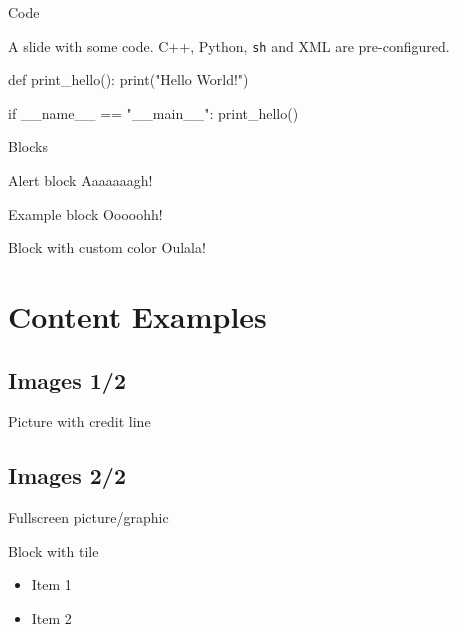 \documentclass[compress]{beamer}
\begin{document}
\begin{frame}[fragile]{Code}

    A slide with some code. C++, Python, \texttt{sh} and XML are pre-configured.

    \begin{pythoncode}

        def print_hello():
        print("Hello World!")


        if __name__ == "__main__":
        print_hello()
    \end{pythoncode}

\end{frame}


\begin{frame}[containsverbatim]{Blocks}
\begin{alertblock}{Alert block}
    Aaaaaaagh!
\end{alertblock}

\begin{exampleblock}{Example block}
    Ooooohh!
\end{exampleblock}

\begingroup
{}
\begin{block}{Block with custom color}
    Oulala!
\end{block}
\endgroup
\end{frame}

\section{Content Examples}

\subsection{Images 1/2}
\begin{frame}{Picture with credit line}
    \begin{figure}
        \centering
    \end{figure}
\end{frame}

\subsection{Images 2/2}
{
    \begin{frame}{Fullscreen picture/graphic}
        \textcolor{white}{
            Normal text goes here.
        }
        \begin{block}{Block with tile}
            \begin{itemize}
                \item Item 1
                \item Item 2
            \end{itemize}
        \end{block}
    \end{frame}
}
\end{document}

